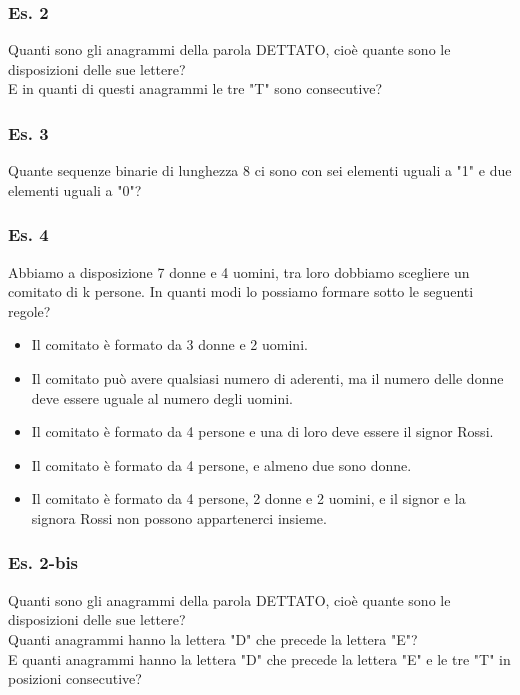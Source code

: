 \subsubsection{Es. 2} Quanti sono gli anagrammi della parola DETTATO, cioè quante sono le disposizioni delle sue lettere? \\ 
E in quanti di questi anagrammi le tre "T" sono consecutive?

\subsubsection{Es. 3} Quante sequenze binarie di lunghezza 8 ci sono con sei elementi uguali a "1" e due elementi uguali a "0"?

\subsubsection{Es. 4} Abbiamo a disposizione 7 donne e 4 uomini, tra loro dobbiamo scegliere un comitato di k persone. 
In quanti modi lo possiamo formare sotto le seguenti regole? 
\begin{itemize}
    \item Il comitato è formato da 3 donne e 2 uomini.
    \item Il comitato può avere qualsiasi numero di aderenti, ma il
    numero delle donne deve essere uguale al numero degli
    uomini.
    \item Il comitato è formato da 4 persone e una di loro deve essere il signor Rossi.
    \item Il comitato è formato da 4 persone, e almeno due sono donne.
    \item Il comitato è formato da 4 persone, 2 donne e 2 uomini, e il signor e la signora Rossi
    non possono appartenerci insieme.
\end{itemize}

\subsubsection{Es. 2-bis}
Quanti sono gli anagrammi della parola DETTATO, cioè quante sono le disposizioni delle sue lettere? \\ 
Quanti anagrammi hanno la lettera "D" che precede la lettera "E"? \\ 
E quanti anagrammi hanno la lettera "D" che precede la lettera "E" e le tre "T" in posizioni consecutive?



\newpage
